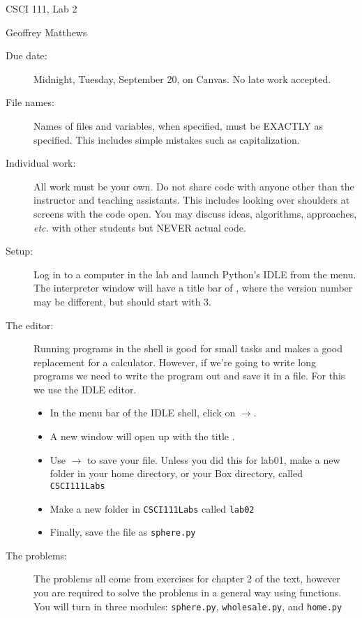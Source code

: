 \documentclass[12pt]{article}
\begin{document}
\sloppy
\centerline{\Large CSCI 111, Lab 2}
\centerline{\large Geoffrey Matthews}

\begin{description}
\item[Due date:] Midnight, Tuesday, September 20, on Canvas.
No late work accepted.  

\item[File names:]  Names of files and variables, when specified,
must be EXACTLY as specified.  This includes simple mistakes such
as capitalization.

\item[Individual work:]  All work must be your own.  Do not share
code with anyone other than the instructor and teaching assistants.
This includes looking over shoulders at screens with the code open.
You may discuss ideas, algorithms, approaches, {\em etc.} with
other students but NEVER actual code.

\item[Setup:] Log in to a computer in the lab and launch
Python's IDLE from the menu.  The interpreter window will have
a title bar of , where the version
number may be different, but should start with 3.



\item[The editor:]  Running programs in the shell
is good for small tasks and makes a good replacement for
a calculator.  However, if we're going to write long
programs we need to write the program out and save
it in a file.  For this we use the IDLE editor.
\begin{itemize}
\item In the menu bar of the IDLE shell, click on
$\rightarrow$.
\item A new window will open up with the title .
\item Use $\rightarrow$ to
save your file.  Unless you did this for lab01,
make a new folder in your home directory,
or your Box directory, called \verb|CSCI111Labs|
\item Make a new folder in \verb|CSCI111Labs| called
\verb|lab02|
\item Finally, save the file as \verb|sphere.py|
\end{itemize}

\item[The problems:] The problems all come from 
exercises for chapter 2 of the text, however 
you are required to solve the problems in a general
way using functions.  You will turn in three
modules: \verb|sphere.py|, \verb|wholesale.py|,
and \verb|home.py|


\end{description}
\end{document}
